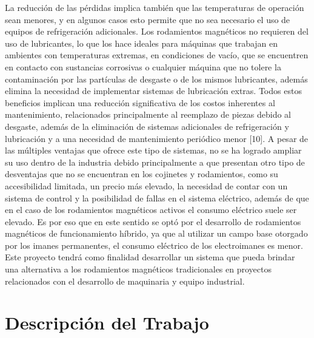 La reducción de las pérdidas implica también que las temperaturas de operación sean menores, y en algunos casos esto permite que no sea necesario el uso de equipos de refrigeración adicionales. 
Los rodamientos magnéticos no requieren del uso de lubricantes, lo que los hace ideales para máquinas que trabajan en ambientes con temperaturas extremas, en condiciones de vacío, que se encuentren en contacto con sustancias corrosivas o cualquier máquina que no tolere la contaminación por las partículas de desgaste o de los mismos lubricantes, además elimina la necesidad de implementar sistemas de lubricación extras.
Todos estos beneficios implican una reducción significativa de los costos inherentes al mantenimiento, relacionados principalmente al reemplazo de piezas debido al desgaste, además de la eliminación de sistemas adicionales de refrigeración y lubricación y a una necesidad de mantenimiento periódico menor [10]. 
A pesar de las múltiples ventajas que ofrece este tipo de sistemas, no se ha logrado ampliar su uso dentro de la industria debido principalmente a que presentan otro tipo de desventajas que no se encuentran en los cojinetes y rodamientos, como su accesibilidad limitada, un precio más elevado, la necesidad de contar con un sistema de control y la posibilidad de fallas en el sistema eléctrico, además de que en el caso de los rodamientos magnéticos activos el consumo eléctrico suele ser elevado. Es por eso que en este sentido se optó por el desarrollo de rodamientos magnéticos de funcionamiento híbrido, ya que al utilizar un campo base otorgado por los imanes permanentes, el consumo eléctrico de los electroimanes es menor. 
Este proyecto tendrá como finalidad desarrollar un sistema que pueda brindar una alternativa a los rodamientos magnéticos tradicionales en proyectos relacionados con el desarrollo de maquinaria y equipo industrial.


\section*{Descripción del Trabajo}
\label{sec:intro:structure}
